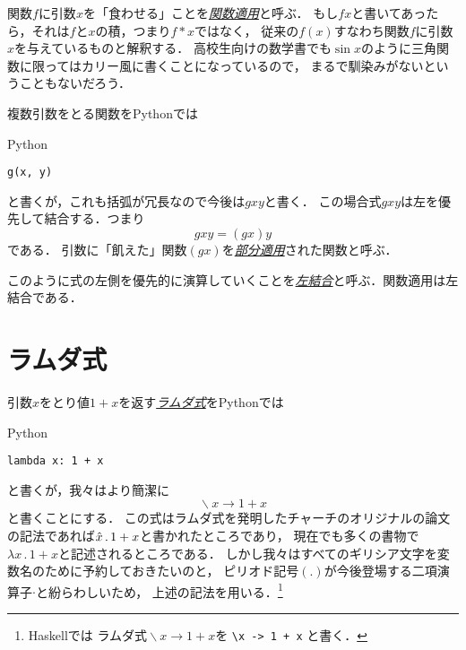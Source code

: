\documentclass[a5paper,draft]{jsbook}
\newcommand{\programminglanguage}[1]{\textsf{#1}}
\newcommand{\haskell}{\programminglanguage{Haskell}}
\newcommand{\python}{\programminglanguage{Python}}
\newcommand{\keyword}[1]{{\underline{\emph{#1}}}}
\newcommand{\code}[1]{\texttt{#1}}
\newenvironment{pythoncode}{\begin{itembox}[r]{\python}}{\end{itembox}}
\DeclareMathOperator{\mathLambda}{\backslash}
\newcommand{\mathLambdaArrow}{\rightarrow}
\newcommand{\mathLambdaExpression}[2]{\mathLambda#1\mathLambdaArrow#2}
\begin{document}

関数$f$に引数$x$を「食わせる」ことを\keyword{関数適用}と呼ぶ．
もし$fx$と書いてあったら，それは$f$と$x$の積，つまり$f*x$ではなく，
従来の$f\left(x\right)$すなわち関数$f$に引数$x$を与えているものと解釈する．
高校生向けの数学書でも$\sin x$のように三角関数に限ってはカリー風に書くことになっているので，
まるで馴染みがないということもないだろう．

複数引数をとる関数を\python では
\begin{pythoncode}
\begin{verbatim}
g(x, y)
\end{verbatim}
\end{pythoncode}
と書くが，これも括弧が冗長なので今後は$gxy$と書く．
この場合式$gxy$は左を優先して結合する．つまり
\begin{equation}
gxy=\left(gx\right)y
\end{equation}
である．
引数に「飢えた」関数$\left(gx\right)$を\keyword{部分適用}された関数と呼ぶ．

このように式の左側を優先的に演算していくことを\keyword{左結合}と呼ぶ．関数適用は左結合である．

\section{ラムダ式}

引数$x$をとり値$1+x$を返す\keyword{ラムダ式}を\python では
\begin{pythoncode}
\begin{verbatim}
lambda x: 1 + x
\end{verbatim}
\end{pythoncode}
と書くが，我々はより簡潔に
\begin{equation}
\mathLambdaExpression{x}{1+x}
\end{equation}
と書くことにする．
この式はラムダ式を発明したチャーチのオリジナルの論文の記法であれば$\Hat x\,.\,1+x$と書かれたところであり，
現在でも多くの書物で$\lambda x\,.\,1+x$と記述されるところである．
しかし我々はすべてのギリシア文字を変数名のために予約しておきたいのと，
ピリオド記号$\left(.\right)$が今後登場する二項演算子$\cdot$と紛らわしいため，
上述の記法を用いる．\footnote{\haskell では
ラムダ式$\mathLambdaExpression{x}{1+x}$を \code{\textbackslash x -> 1 + x} と書く．}
\end{document}

